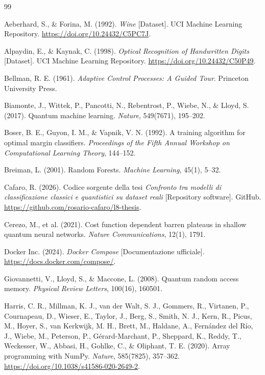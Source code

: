 \cleardoublepage
{}
{}

\begin{thebibliography}{99}

Aeberhard, S., \& Forina, M. (1992). \textit{Wine} [Dataset]. UCI Machine Learning Repository. \url{https://doi.org/10.24432/C5PC7J}.

Alpaydin, E., \& Kaynak, C. (1998). \textit{Optical Recognition of Handwritten Digits} [Dataset]. UCI Machine Learning Repository. \url{https://doi.org/10.24432/C50P49}.

Bellman, R. E. (1961). \textit{Adaptive Control Processes: A Guided Tour}. Princeton University Press.

Biamonte, J., Wittek, P., Pancotti, N., Rebentrost, P., Wiebe, N., \& Lloyd, S. (2017). Quantum machine learning. \textit{Nature}, 549(7671), 195--202.

Boser, B. E., Guyon, I. M., \& Vapnik, V. N. (1992). A training algorithm for optimal margin classifiers. \textit{Proceedings of the Fifth Annual Workshop on Computational Learning Theory}, 144--152.

Breiman, L. (2001). Random Forests. \textit{Machine Learning}, 45(1), 5--32.

Cafaro, R. (2026). Codice sorgente della tesi \textit{Confronto tra modelli di classificazione classici e quantistici su dataset reali} [Repository software]. GitHub. \url{https://github.com/rosario-cafaro/l8-thesis}.

Cerezo, M., et al. (2021). Cost function dependent barren plateaus in shallow quantum neural networks. \textit{Nature Communications}, 12(1), 1791.

Docker Inc. (2024). \textit{Docker Compose} [Documentazione ufficiale]. \url{https://docs.docker.com/compose/}.

Giovannetti, V., Lloyd, S., \& Maccone, L. (2008). Quantum random access memory. \textit{Physical Review Letters}, 100(16), 160501.

Harris, C. R., Millman, K. J., van der Walt, S. J., Gommers, R., Virtanen, P., Cournapeau, D., Wieser, E., Taylor, J., Berg, S., Smith, N. J., Kern, R., Picus, M., Hoyer, S., van Kerkwijk, M. H., Brett, M., Haldane, A., Fernández del Río, J., Wiebe, M., Peterson, P., Gérard-Marchant, P., Sheppard, K., Reddy, T., Weckesser, W., Abbasi, H., Gohlke, C., \& Oliphant, T. E. (2020). Array programming with NumPy. \textit{Nature}, 585(7825), 357--362. \url{https://doi.org/10.1038/s41586-020-2649-2}.


\end{thebibliography}
